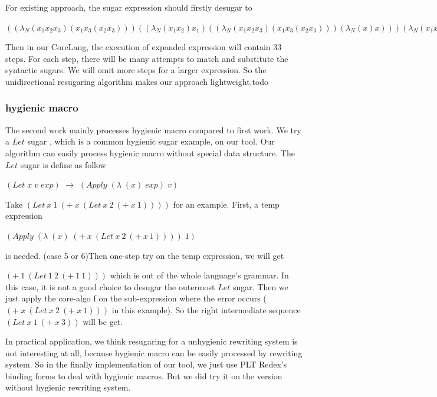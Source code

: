 For existing approach, the sugar expression should firstly desugar to
\begin{flushleft}
$((\lambda _{N}
   (x_{1} x_{2} x_{3})
   (x_{1} x_{3} (x_{2} x_{3})))
  ((\lambda _{N} (x_{1} x_{2}) x_{1})
   ((\lambda _{N}
     (x_{1} x_{2} x_{3})
     (x_{1} x_{3} (x_{2} x_{3})))
    (\lambda _{N} (x) x)))
  (\lambda _{N} (x_{1} x_{2}) x_{1})
  xx
  yy)$
\end{flushleft}

Then in our CoreLang, the execution of expanded expression will contain 33 steps. For each step, there will be many attempts to match and substitute the syntactic sugars. We will omit more steps for a larger expression. So the unidirectional resugaring algorithm makes our approach lightweight.todo

\subsubsection{hygienic macro}
\label{mark:hygienic}

The second work\cite{hygienic} mainly processes hygienic macro compared to first work. We try a $Let$ sugar , which is a common hygienic sugar example, on our tool. Our algorithm can easily process hygienic macro without special data structure. The $Let$ sugar is define as follow

$(Let\;x\;v\;exp)$ $\rightarrow$ $(Apply\;(\lambda\;(x)\;exp)\;v)$

Take $(Let~x~1~(+~x~(Let~x~2~(+~x~1))))$ for an example. First, a temp expression

$(Apply\;(\lambda\;(x)\;(+~x~(Let~x~2~(+~x~1))))\;1)$

is needed. (case 5 or 6)Then one-step try on the temp expression, we will get

$(+~1~(Let~1~2~(+~1~1)))$ which is out of the whole language's grammar. In this case, it is not a good choice to desugar the outermost $Let$ sugar. Then we just apply the core-algo f on the sub-expression where the error occurs ($(+~x~(Let~x~2~(+~x~1)))$ in this example). So the right intermediate sequence $(Let~x~1~(+~x~3))$ will be get.

In practical application, we think resugaring for a unhygienic rewriting system is not interesting at all, because hygienic macro can be easily processed by rewriting system. So in the finally implementation of our tool, we just use PLT Redex's binding forms to deal with hygienic macros. But we did try it on the version without hygienic rewriting system.

